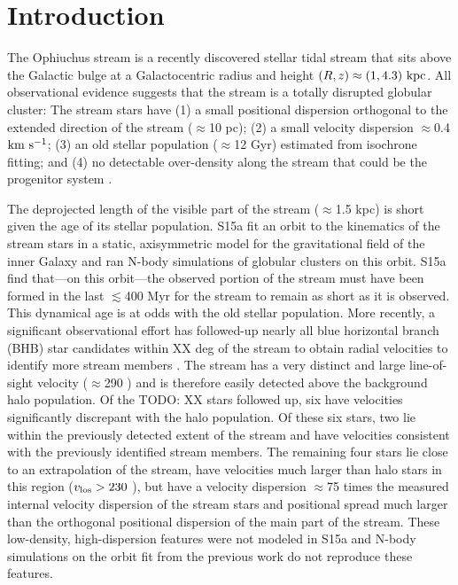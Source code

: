 \documentclass[letterpaper,12pt,preprint]{aastex}
\newcommand{\todo}[1]{{\color{red} TODO: #1}}
\begin{document}

\section{Introduction}\label{sec:introduction}

The Ophiuchus stream \citep{bernard14, sesar15a} is a recently discovered stellar tidal stream that sits above the Galactic bulge at a Galactocentric radius and height $(R,z) \approx (1, 4.3)~{\rm kpc}$. All observational evidence suggests that the stream is a totally disrupted globular cluster: The stream stars have (1) a small positional dispersion orthogonal to the extended direction of the stream ($\approx$10 pc); (2) a small velocity dispersion $\approx$0.4 ${\rm km}~{\rm s}^{-1}$; (3) an old stellar population ($\approx$12 Gyr) estimated from isochrone fitting; and (4) no detectable over-density along the stream that could be the progenitor system \citep[][hereafter S15a]{sesar15a}. 

The deprojected length of the visible part of the stream ($\approx$1.5 kpc) is short given the age of its stellar population. S15a fit an orbit to the kinematics of the stream stars in a static, axisymmetric model for the gravitational field of the inner Galaxy and ran N-body simulations of globular clusters on this orbit. S15a find that---on this orbit---the observed portion of the stream must have been formed in the last $\lesssim$400 Myr for the stream to remain as short as it is observed. This dynamical age is at odds with the old stellar population. More recently, a significant observational effort has followed-up nearly all blue horizontal branch (BHB) star candidates within XX deg of the stream to obtain radial velocities to identify more stream members \citep[][hereafter S15b]{sesar15b}. The stream has a very distinct and large line-of-sight velocity ($\approx$290 \kms) and is therefore easily detected above the background halo population. Of the \todo{XX} stars followed up, six have velocities significantly discrepant with the halo population. Of these six stars, two lie within the previously detected extent of the stream and have velocities consistent with the previously identified stream members. The remaining four stars lie close to an extrapolation of the stream, have velocities much larger than halo stars in this region ($v_{\rm los}>230$ \kms), but have a velocity dispersion $\approx$75 times the measured internal velocity dispersion of the stream stars and positional spread much larger than the orthogonal positional dispersion of the main part of the stream. These low-density, high-dispersion features were not modeled in S15a and N-body simulations on the orbit fit from the previous work do not  reproduce these features.
\end{document}
